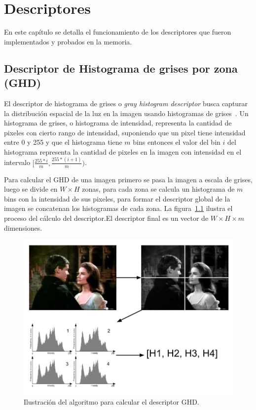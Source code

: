 \chapter{Descriptores}\label{cap_descriptores}
 En este capítulo se detalla el funcionamiento de los descriptores que fueron implementados y probados en la memoria.

\section{Descriptor de Histograma de grises por zona (GHD)}\label{ghd}
El descriptor de histograma de grises o \emph{gray histogram descriptor} busca capturar la distribución espacial de la luz en la imagen usando histogramas de grises~\cite{tesis}. Un histograma de grises, o histograma de intensidad, representa la cantidad de pixeles con cierto rango de intensidad, suponiendo que un pixel tiene intensidad entre 0 y 255 y que el histograma tiene $m$ bins entonces el valor del bin $i$ del histograma representa la cantidad de pixeles en la imagen con intensidad en el intervalo $[\frac{255*i}{m},\frac{255*(i+1)}{m})$.

Para calcular el GHD de una imagen primero se pasa la imagen a escala de grises, luego se divide en $W \times H$ zonas, para cada zona se calcula un histograma de $m$ bins con la intensidad de sus pixeles, para formar el descriptor global de la imagen se concatenan los histogramas de cada zona. La figura~\ref{descriptor_ghd} ilustra el proceso del cálculo del descriptor.El descriptor final es un vector de $W \times H \times m$ dimensiones.
    \begin{figure}[!h]
		\centering
		\includegraphics[scale=0.4]{imagenes/cap3/descriptor_ghd.png}
		\caption{Ilustración del algoritmo para calcular el descriptor GHD.}
		\label{descriptor_ghd}
	\end{figure}

